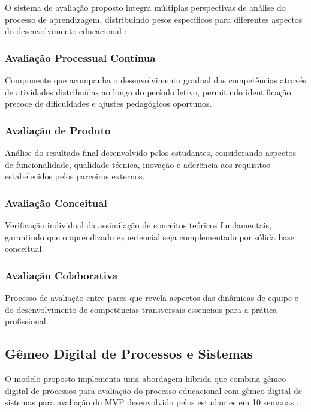 \documentclass[12pt, a4paper, oneside, brazilian]{abntex2}
\begin{document}
O sistema de avaliação proposto integra múltiplas perspectivas de análise do processo de aprendizagem, distribuindo pesos específicos para diferentes aspectos do desenvolvimento educacional \cite{inteli2024}:

\subsubsection{Avaliação Processual Contínua}

Componente que acompanha o desenvolvimento gradual das competências através de atividades distribuídas ao longo do período letivo, permitindo identificação precoce de dificuldades e ajustes pedagógicos oportunos.

\subsubsection{Avaliação de Produto}

Análise do resultado final desenvolvido pelos estudantes, considerando aspectos de funcionalidade, qualidade técnica, inovação e aderência aos requisitos estabelecidos pelos parceiros externos.

\subsubsection{Avaliação Conceitual}

Verificação individual da assimilação de conceitos teóricos fundamentais, garantindo que o aprendizado experiencial seja complementado por sólida base conceitual.

\subsubsection{Avaliação Colaborativa}

Processo de avaliação entre pares que revela aspectos das dinâmicas de equipe e do desenvolvimento de competências transversais essenciais para a prática profissional.

\subsection{Gêmeo Digital de Processos e Sistemas}

O modelo proposto implementa uma abordagem híbrida que combina gêmeo digital de processos para avaliação do processo educacional com gêmeo digital de sistemas para avaliação do MVP desenvolvido pelos estudantes em 10 semanas \cite{barricelli2019}:
\end{document}
